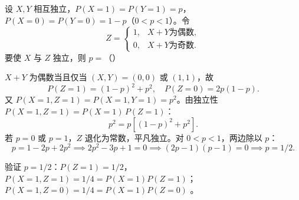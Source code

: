 ﻿\documentclass[lang=cn,11pt]{elegantbook}
\begin{document}
\begin{exercise}[独立性条件求参数] \label{exer:3-d2}
设 $X,Y$ 相互独立，$P(X=1)=P(Y=1)=p$，$P(X=0)=P(Y=0)=1-p$（$0<p<1$）。令
\[
Z = \begin{cases} 1, & X+Y \text{为偶数}, \\ 0, & X+Y \text{为奇数}. \end{cases}
\]
要使 $X$ 与 $Z$ 独立，则 $p = $（\quad）
\end{exercise}
\begin{solution}
$X+Y$ 为偶数当且仅当 $(X,Y) = (0,0)$ 或 $(1,1)$，故
\[
P(Z=1) = (1-p)^2+p^2,\quad P(Z=0) = 2p(1-p).
\]
又 $P(X=1,Z=1) = P(X=1,Y=1) = p^2$。由独立性 $P(X=1,Z=1) = P(X=1)\,P(Z=1)$：
\[
p^2 = p\left[(1-p)^2+p^2\right].
\]
若 $p=0$ 或 $p=1$，$Z$ 退化为常数，平凡独立。对 $0<p<1$，两边除以 $p$：
\[
p = 1-2p+2p^2 \implies 2p^2-3p+1 = 0 \implies (2p-1)(p-1) = 0 \implies p = 1/2.
\]
\begin{note}
验证 $p=1/2$：$P(Z=1)=1/2$，$P(X=1,Z=1)=1/4=P(X=1)P(Z=1)$；$P(X=1,Z=0)=1/4=P(X=1)P(Z=0)$ 。
\end{note}
\end{solution}
\end{document}
